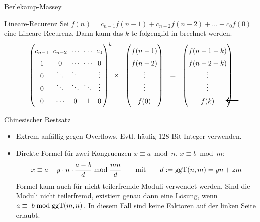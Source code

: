 \begin{algorithm}{Berlekamp-Massey}
	\begin{methods}
	\end{methods}
\end{algorithm}

\begin{algorithm}{Lineare-Recurenz}
	Sei $f(n)=c_{n-1}f(n-1)+c_{n-2}f(n-2)+\dots + c_0f(0)$ eine Lineare Recurenz. Dann kann das \mbox{$k$-te} folgenglid in  brechnet werden.
	$$\renewcommand\arraystretch{1.5}
	\setlength\arraycolsep{3pt}
	\begin{pmatrix} 
		c_{n-1} & c_{n-2} & \smash{\cdots} & \smash{\cdots} & c_0 \\
		1 & 0 & \smash{\cdots} & \smash{\cdots} & 0 \\
		0 & \smash{\ddots} & \smash{\ddots} & & \smash{\vdots} \\
		0 & \smash{\ddots} & \smash{\ddots} & \smash{\ddots} & \smash{\vdots} \\
		0 & \smash{\cdots} & 0 & 1 & 0 \\
	\end{pmatrix}^k
	\times~~
	\begin{pmatrix} 
		f(n-1) \\
		f(n-2) \\
		\smash{\vdots} \\
		\smash{\vdots} \\
		f(0) \\
	\end{pmatrix}
	~~=~~
	\begin{pmatrix} 
	f(n-1+k) \\
	f(n-2+k) \\
	\smash{\vdots} \\
	\smash{\vdots} \\
	f(k) \makebox[0pt][l]{\hspace{15pt}$\vcenter{\hbox{\huge$\leftarrow$}}$}\\
	\end{pmatrix}
	$$
\end{algorithm}

\begin{algorithm}{Chinesischer Restsatz}
	\begin{itemize}
		\item Extrem anfällig gegen Overflows. Evtl. häufig 128-Bit Integer verwenden.
		\item Direkte Formel für zwei Kongruenzen $x \equiv a \bmod n$, $x \equiv b \bmod m$:
		\[
			x \equiv a - y \cdot n \cdot \frac{a - b}{d} \bmod \frac{mn}{d}
			\qquad \text{mit} \qquad
			d := \text{ggT}(n, m) = yn + zm
		\]
		Formel kann auch für nicht teilerfremde Moduli verwendet werden.
		Sind die Moduli nicht teilerfremd, existiert genau dann eine Lösung,
		wenn $a\equiv~b \bmod \text{ggT}(m, n)$.
		In diesem Fall sind keine Faktoren
		auf der linken Seite erlaubt.
	\end{itemize}
\end{algorithm}

